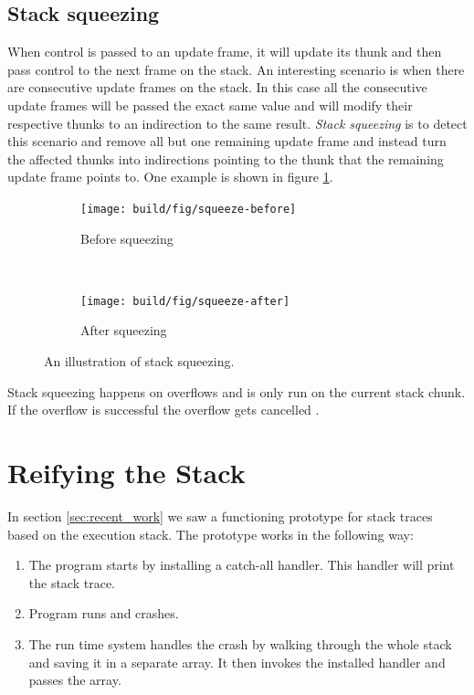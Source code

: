 \subsection{Stack squeezing}

When control is passed to an update frame, it will update its thunk and
then pass control to the next frame on the stack. An interesting scenario
is when there are consecutive update frames on the stack. In this case
all the consecutive update frames will be passed the exact same value
and will modify their respective thunks to an indirection to the same result.
\emph{Stack squeezing}
is to detect this scenario and remove all but one remaining update frame
and instead turn the affected thunks into indirections pointing to the
thunk that the remaining update frame points to. One example
is shown in figure \ref{fig:stack_squeezing}. \cite{github_thread_paused}

\begin{figure}
\begin{mdframed}
  \begin{subfigure}[t]{0.5\textwidth}
    \texttt{[image: build/fig/squeeze-before]}
    \caption{Before squeezing}
  \end{subfigure}
        ~ %
  \begin{subfigure}[t]{0.5\textwidth}
    \texttt{[image: build/fig/squeeze-after]}
    \caption{After squeezing}
  \end{subfigure}
  \caption{An illustration of stack squeezing.
  }\label{fig:stack_squeezing}
\end{mdframed}
\end{figure}

Stack squeezing happens on overflows and is only run on the current
stack chunk. If the overflow is successful the overflow gets cancelled
\cite{github_return_if_squeezed}.

\section{Reifying the Stack} \label{sec:reifying_the_stack}

In section \ref{sec:recent_work} we saw a functioning prototype for
stack traces based on the execution stack. The prototype works in the
following way:

\begin{enumerate}
  \item
    The program starts by installing a catch-all handler. This handler will
    print the stack trace.
  \item
    Program runs and crashes.
  \item
    The run time system handles the crash by walking through the whole
    stack and saving it in a separate array. It then invokes the
    installed handler and passes the array.
\end{enumerate}

